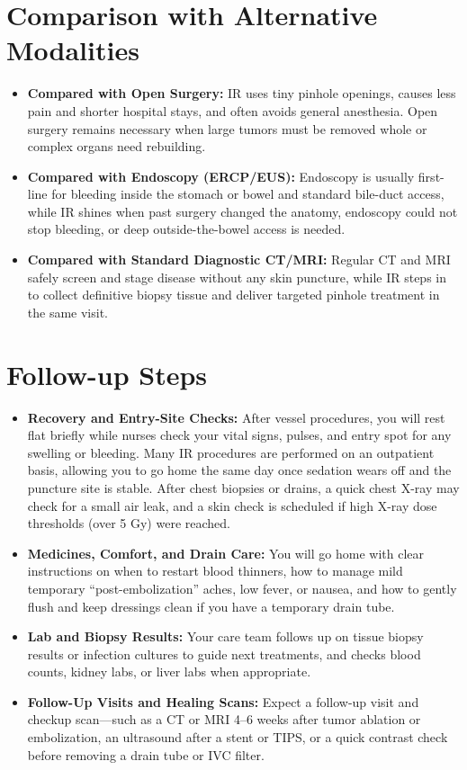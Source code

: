 \section{Comparison with Alternative Modalities}

\begin{itemize}
    \item \textbf{Compared with Open Surgery:} IR uses tiny pinhole openings, causes less pain and shorter hospital stays, and often avoids general anesthesia. Open surgery remains necessary when large tumors must be removed whole or complex organs need rebuilding.
    \item \textbf{Compared with Endoscopy (ERCP/EUS):} Endoscopy is usually first-line for bleeding inside the stomach or bowel and standard bile-duct access, while IR shines when past surgery changed the anatomy, endoscopy could not stop bleeding, or deep outside-the-bowel access is needed.
    \item \textbf{Compared with Standard Diagnostic CT/MRI:} Regular CT and MRI safely screen and stage disease without any skin puncture, while IR steps in to collect definitive biopsy tissue and deliver targeted pinhole treatment in the same visit.
\end{itemize}

\section{Follow-up Steps}

\begin{itemize}
    \item \textbf{Recovery and Entry-Site Checks:} After vessel procedures, you will rest flat briefly while nurses check your vital signs, pulses, and entry spot for any swelling or bleeding. Many IR procedures are performed on an outpatient basis, allowing you to go home the same day once sedation wears off and the puncture site is stable. After chest biopsies or drains, a quick chest X-ray may check for a small air leak, and a skin check is scheduled if high X-ray dose thresholds (over 5 Gy) were reached.
    \item \textbf{Medicines, Comfort, and Drain Care:} You will go home with clear instructions on when to restart blood thinners, how to manage mild temporary ``post-embolization'' aches, low fever, or nausea, and how to gently flush and keep dressings clean if you have a temporary drain tube.
    \item \textbf{Lab and Biopsy Results:} Your care team follows up on tissue biopsy results or infection cultures to guide next treatments, and checks blood counts, kidney labs, or liver labs when appropriate.
    \item \textbf{Follow-Up Visits and Healing Scans:} Expect a follow-up visit and checkup scan---such as a CT or MRI 4--6 weeks after tumor ablation or embolization, an ultrasound after a stent or TIPS, or a quick contrast check before removing a drain tube or IVC filter.
\end{itemize}

